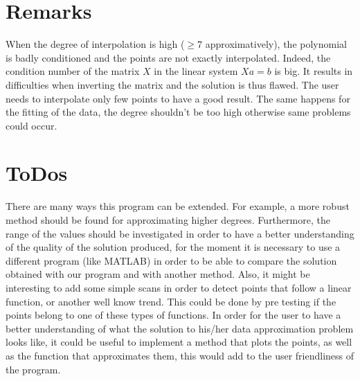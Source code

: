 \documentclass[12pt]{article}
\begin{document}
\section{Remarks}
When the degree of interpolation is high ($\ge 7$ approximatively), the polynomial is badly conditioned and the points are not exactly interpolated. Indeed, the condition number of the matrix $X$ in the linear system $Xa=b$ is big. It results in difficulties when inverting the matrix and the solution is thus flawed. The user needs to interpolate only few points to have a good result.
The same happens for the fitting of the data, the degree shouldn't be too high otherwise same problems could occur.


\section{ToDos}
There are many ways this program can be extended. For example, a more robust method should be found for approximating higher degrees. Furthermore, the range of the values should be investigated in order to have a better understanding of the quality of the solution produced, for the moment it is necessary to use a different program (like MATLAB) in order to be able to compare the solution obtained with our program and with another method. Also, it might be interesting to add some simple scans in order to detect points that follow a linear function, or another well know trend. This could be done by pre testing if the points belong to one of these types of functions.
In order for the user to have a better understanding of what the solution to his/her data approximation problem looks like, it could be useful to implement a method that plots the points, as well as the function that approximates them, this would add to the user friendliness of the program.
 
\end{document}
